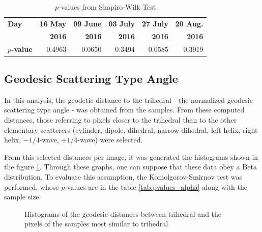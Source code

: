 \documentclass[12pt]{article}
\begin{document}
\begin{table}[hbt]
  \centering
  \caption{$p$-values from Shapiro-Wilk Test}
  \label{tab:pvalues_purities}
  \begin{tabular}{lrrrrr}
    \toprule
    \textbf{Day} & \textbf{16 May} & \textbf{09 June} & \textbf{03 July} & \textbf{27 July} & \textbf{20 Aug.}\\
                 & \textbf{2016} & \textbf{2016} & \textbf{2016} & \textbf{2016} & \textbf{2016}\\
    \textbf{$p$-value} & 0.4963 & 0.0650 & 0.3494 & 0.0585 & 0.3919\\
    \bottomrule
  \end{tabular}
\end{table}

\subsection{Geodesic Scattering Type Angle}

In this analysis, the geodetic distance to the trihedral - the normalized geodesic scattering type angle - was obtained from the samples. From these computed distances, those referring to pixels closer to the trihedral than to the other elementary scatterers (cylinder, dipole, dihedral, narrow dihedral, left helix, right helix, $-1/4$-wave, $+1/4$-wave) were selected.

From this selected distances per image, it was generated the histograms shown in the figure \ref{fig:histograms_alpha}. Through these graphs, one can suppose that these data obey a Beta distribution. To evaluate this assumption, the Komolgorov-Smirnov test was performed, whose $p$-values are in the table \ref{tab:pvalues_alpha} along with the sample size.

\begin{figure}[hbt]
\centering
{}
\caption{Histograms of the geodesic distances between trihedral and the pixels of the samples most similar to trihedral}
\label{fig:histograms_alpha}
\end{figure}
\end{document}
